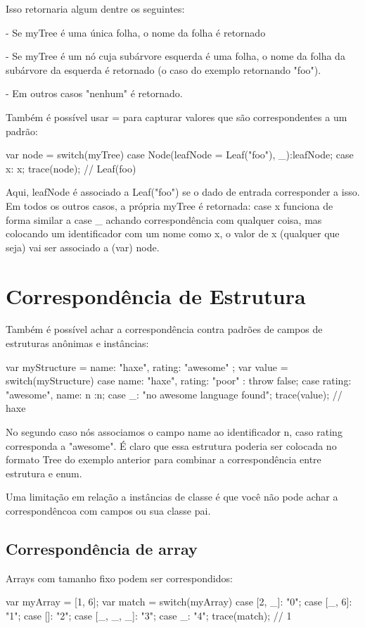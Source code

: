 {Isso retornaria algum dentre os seguintes:

  - Se myTree é uma única folha, o nome da folha é retornado

  - Se myTree é um nó cuja subárvore esquerda é uma folha, o nome da folha da subárvore da esquerda é retornado (o caso do exemplo retornando "foo").

  - Em outros casos "nenhum" é retornado.

Também é possível usar = para capturar valores que são correspondentes a um padrão:

var node = switch(myTree) {
    case Node(leafNode = Leaf("foo"), _):leafNode;
    case x: x;
}
trace(node); // Leaf(foo)

Aqui, leafNode é associado a Leaf("foo") se o dado de entrada corresponder a isso. Em todos os outros casos, a própria myTree é retornada: case x funciona de forma similar a case _ achando correspondência com qualquer coisa, mas colocando um identificador com um nome como x, o valor de x (qualquer que seja) vai ser associado a (var) node.

\section{Correspondência de Estrutura}

Também é possível achar a correspondência contra padrões de campos de estruturas anônimas e instâncias:

var myStructure = {
    name: "haxe",
    rating: "awesome"
};
var value = switch(myStructure) {
    case { name: "haxe", rating: "poor" }: throw false;
    case { rating: "awesome", name: n }:n;
    case _: "no awesome language found";
}
trace(value); // haxe

No segundo caso nós associamos o campo name ao identificador n, caso rating corresponda a "awesome". É claro que essa estrutura poderia ser colocada no formato Tree do exemplo anterior para combinar a correspondência entre estrutura e enum.

Uma limitação em relação a instâncias de classe é que você não pode achar a correspondêncoa com campos ou sua classe pai.

\subsection{Correspondência de array}

Arrays com tamanho fixo  podem ser correspondidos:

var myArray = [1, 6];
var match = switch(myArray) {
    case [2, _]: "0";
    case [_, 6]: "1";
    case []: "2";
    case [_, _, _]: "3";
    case _: "4";
}
trace(match); // 1

}
